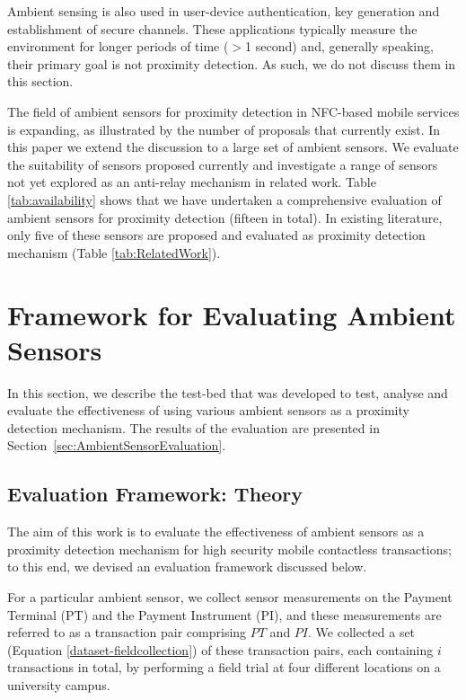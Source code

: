 \documentclass{article}
\begin{document}
Ambient sensing is also used in user-device authentication, key generation and establishment of secure channels.  These applications typically measure the environment for longer periods of time ($>$1 second) and, generally speaking, their primary goal is not proximity detection.  As such, we do not discuss them in this section.  

The field of ambient sensors for proximity detection in NFC-based mobile services is expanding, as illustrated by the number of proposals that currently exist.  In this paper we extend the discussion to a large set of ambient sensors.  We evaluate the suitability of sensors proposed currently and investigate a range of sensors not yet explored as an anti-relay mechanism in related work.  Table \ref{tab:availability} shows that we have undertaken a comprehensive evaluation of ambient sensors for proximity detection (fifteen in total).  In existing literature, only five of these sensors are proposed and evaluated as proximity detection mechanism (Table \ref{tab:RelatedWork}).  

\section{Framework for Evaluating Ambient Sensors}
\label{sec:FrameworkforEvaluationofAmbientSensorsEffectiveness}

In this section, we describe the test-bed that was developed to test, analyse and evaluate the effectiveness of using various ambient sensors as a proximity detection mechanism.  The results of the evaluation are presented in Section~\ref{sec:AmbientSensorEvaluation}.

\subsection{Evaluation Framework: Theory}
\label{sec:EvaluationFrameworkinTheory}
The aim of this work is to evaluate the effectiveness of ambient sensors as a proximity detection mechanism for high security mobile contactless transactions; to this end, we devised an evaluation framework discussed below.



For a particular ambient sensor, we collect sensor measurements on the Payment Terminal (PT) and the Payment Instrument (PI), and these measurements are referred to as a transaction pair comprising $PT$ and $PI$.  We collected a set (Equation \ref{dataset-fieldcollection}) of these transaction pairs, each containing $i$ transactions in total, by performing a field trial at four different locations on a university campus.
\end{document}
